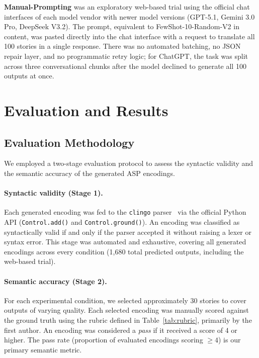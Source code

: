 \documentclass[runningheads]{llncs}
\begin{document}
\textbf{Manual-Prompting} was an exploratory web-based trial using the
official chat interfaces of each model vendor with newer model versions
(GPT-5.1, Gemini 3.0 Pro, DeepSeek V3.2).  The prompt, equivalent to
FewShot-10-Random-V2 in content, was pasted directly into the chat interface
with a request to translate all 100 stories in a single response.  There was
no automated batching, no JSON repair layer, and no programmatic retry
logic; for ChatGPT, the task was split across three conversational chunks
after the model declined to generate all 100 outputs at once.



\section{Evaluation and Results}
\label{sec:eval}

\subsection{Evaluation Methodology}
\label{sec:eval-method}

We employed a two-stage evaluation protocol to assess the syntactic
validity and the semantic accuracy of the generated ASP encodings.

\paragraph{Syntactic validity (Stage 1).}  Each generated encoding was fed to
the \texttt{clingo} parser~\cite{gebser2014clingo} via the official Python
API (\texttt{Control.add()} and \texttt{Control.ground()}).  An encoding was
classified as syntactically valid if and only if the parser accepted it
without raising a lexer or syntax error.  This stage was automated and
exhaustive, covering all generated encodings across every condition (1{,}680
total predicted outputs, including the web-based trial).

\paragraph{Semantic accuracy (Stage 2).}  For each experimental condition, we
selected approximately 30 stories to cover outputs of varying quality.  Each selected encoding was manually scored against the ground truth using the rubric defined in Table~\ref{tab:rubric}, primarily by the first author. An encoding was considered a \textit{pass} if it
received a score of 4 or higher.  The pass rate (proportion of evaluated
encodings scoring $\ge 4$) is our primary semantic metric.
\end{document}

